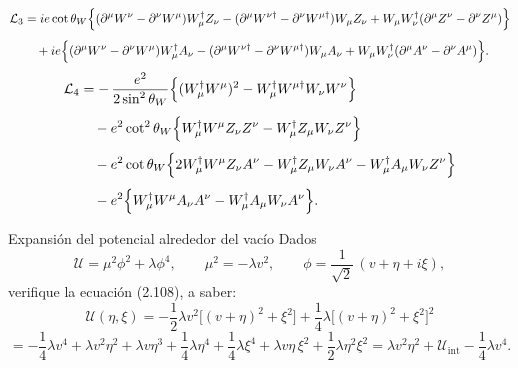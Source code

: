 \begin{align*}
\mathcal{L}_3
&= {i e \cot\theta_W}
  \Big\{
    (\partial^\mu W^\nu - \partial^\nu W^\mu) W_\mu^\dagger Z_\nu
    - (\partial^\mu W^{\nu\dagger} - \partial^\nu W^{\mu\dagger}) W_\mu Z_\nu
    + W_\mu W_\nu^\dagger (\partial^\mu Z^\nu - \partial^\nu Z^\mu)
  \Big\} \notag\\[4pt]
&\quad
  + { i e}
  \Big\{
    (\partial^\mu W^\nu - \partial^\nu W^\mu) W_\mu^\dagger A_\nu
    - (\partial^\mu W^{\nu\dagger} - \partial^\nu W^{\mu\dagger}) W_\mu A_\nu
    + W_\mu W_\nu^\dagger (\partial^\mu A^\nu - \partial^\nu A^\mu)
  \Big\}.
\end{align*}
\begin{align*}
\mathcal{L}_4
&= -\,\frac{e^2}{2 \sin^2 \theta_W}
  \Big\{
    (W_\mu^\dagger W^\mu)^2
    - W_\mu^\dagger W^{\mu\dagger} W_\nu W^\nu
  \Big\} \notag\\[4pt]
&\quad
  - {e^2 \cot^2 \theta_W}
  \Big\{
    W_\mu^\dagger W^\mu Z_\nu Z^\nu
    - W_\mu^\dagger Z_\mu W_\nu Z^\nu
  \Big\} \notag\\[4pt]
&\quad
  - { e^2 \cot \theta_W}
  \Big\{
    2 W_\mu^\dagger W^\mu Z_\nu A^\nu
    - W_\mu^\dagger Z_\mu W_\nu A^\nu
    - W_\mu^\dagger A_\mu W_\nu Z^\nu
  \Big\} \notag\\[4pt]
&\quad
  - { e^2}
  \Big\{
    W_\mu^\dagger W^\mu A_\nu A^\nu
    - W_\mu^\dagger A_\mu W_\nu A^\nu
  \Big\}.
\end{align*}






\begin{Ejercicio}{Expansión del potencial alrededor del vacío}\label{Ej:17}
Dados
\[
\mathcal{U}=\mu^2\phi^2+\lambda \phi^4,\qquad \mu^2=-\lambda v^2,\qquad 
\phi=\frac{1}{\sqrt{2}}\,(v+\eta+i\xi),
\]
verifique la ecuación (2.108), a saber:
\[
\mathcal{U}(\eta,\xi)= -\frac{1}{2}\lambda v^2\Big[(v+\eta)^2+\xi^2\Big]
+ \frac{1}{4}\lambda\Big[(v+\eta)^2+\xi^2\Big]^2
\]
\[
= -\frac{1}{4}\lambda v^4 + \lambda v^2\eta^2 + \lambda v\eta^3 + \frac{1}{4}\lambda\eta^4
+ \frac{1}{4}\lambda\xi^4 + \lambda v\eta\,\xi^2 + \frac{1}{2}\lambda \eta^2\xi^2
= \lambda v^2\eta^2 + \mathcal{U}_{\text{int}} - \frac{1}{4}\lambda v^4.
\]
\end{Ejercicio}

